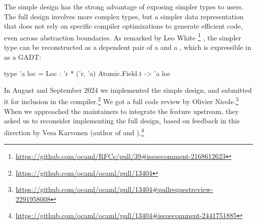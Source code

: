 The simple design has the strong advantage of exposing simpler types to users.
The full design involves more complex types, but a simpler data representation that does not rely on specific compiler optimizations to generate efficient code, even across abstraction boundaries.
As remarked by Leo White%
\footnote{
\url{https://github.com/ocaml/RFCs/pull/39#issuecomment-2168612623}
}%
, the simpler type  can be reconstructed as a dependent pair of a  and a , which is expressible in \OCaml as a GADT:
\begin{ocamlcode}
type 'a loc = Loc : 'r * ('r, 'a) Atomic.Field.t -> 'a loc
\end{ocamlcode}

In August and September 2024 we implemented the simple design, and submitted it for inclusion in the \OCaml compiler.\footnote{\url{https://github.com/ocaml/ocaml/pull/13404}}
We got a full code review by Olivier Nicole.\footnote{\url{https://github.com/ocaml/ocaml/pull/13404#pullrequestreview-2291958008}}
When we approached the \OCaml maintainers to integrate the feature upstream, they asked us to reconsider implementing the full design, based on feedback in this direction by Vesa Karvonen (author of \Kcas and \Saturn).\footnote{\url{https://github.com/ocaml/ocaml/pull/13404#issuecomment-2441751885}}

